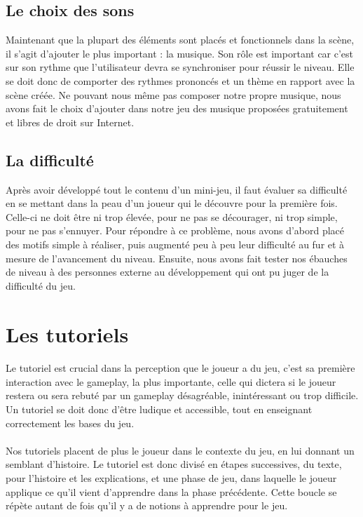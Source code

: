 \subsection{Le choix des sons}

Maintenant que la plupart des éléments sont placés et fonctionnels dans la scène, il s'agit d'ajouter le plus important : la musique. Son rôle est important car c'est sur son rythme que l'utilisateur devra se synchroniser pour réussir le niveau. Elle se doit donc de comporter des rythmes prononcés et un thème en rapport avec la scène créée.
Ne pouvant nous même pas composer notre propre musique, nous avons fait le choix d'ajouter dans notre jeu des musique proposées gratuitement et libres de droit sur Internet.

\subsection{La difficulté}

Après avoir développé tout le contenu d'un mini-jeu, il faut évaluer sa difficulté en se mettant dans la peau d'un joueur qui le découvre pour la première fois. Celle-ci ne doit être ni trop élevée, pour ne pas se décourager, ni trop simple, pour ne pas s'ennuyer. Pour répondre à ce problème, nous avons d'abord placé des motifs simple à réaliser, puis augmenté peu à peu leur difficulté au fur et à mesure de l'avancement du niveau. Ensuite, nous avons fait tester nos ébauches de niveau à des personnes externe au développement qui ont pu juger de la difficulté du jeu.


\section{Les tutoriels}

\paragraph{}
Le tutoriel est crucial dans la perception que le joueur a du jeu, c'est sa première interaction avec le gameplay, la plus importante, celle qui dictera si le joueur restera ou sera rebuté par un gameplay désagréable, inintéressant ou trop difficile. Un tutoriel se doit donc d'être ludique et accessible, tout en enseignant correctement les bases du jeu.

\paragraph{}
Nos tutoriels placent de plus le joueur dans le contexte du jeu, en lui donnant un semblant d'histoire. Le tutoriel est donc divisé en étapes successives, du texte, pour l'histoire et les explications, et une phase de jeu, dans laquelle le joueur applique ce qu'il vient d'apprendre dans la phase précédente. Cette boucle se répète autant de fois qu'il y a de notions à apprendre pour le jeu.


